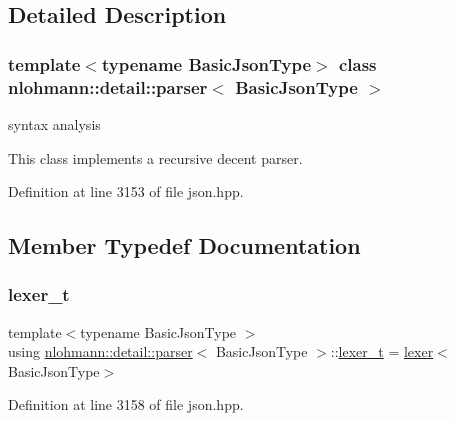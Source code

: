 \subsection{Detailed Description}
\subsubsection*{template$<$typename Basic\+Json\+Type$>$\newline
class nlohmann\+::detail\+::parser$<$ Basic\+Json\+Type $>$}

syntax analysis 

This class implements a recursive decent parser. 

Definition at line 3153 of file json.\+hpp.



\subsection{Member Typedef Documentation}
\mbox{\label{classnlohmann_1_1detail_1_1parser_a16030c5af158a94d1c799f82ff3a0147}} 
\subsubsection{\texorpdfstring{lexer\+\_\+t}{lexer\_t}}
{\footnotesize\ttfamily template$<$typename Basic\+Json\+Type $>$ \\
using \hyperlink{classnlohmann_1_1detail_1_1parser}{nlohmann\+::detail\+::parser}$<$ Basic\+Json\+Type $>$\+::\hyperlink{classnlohmann_1_1detail_1_1parser_a16030c5af158a94d1c799f82ff3a0147}{lexer\+\_\+t} =  \hyperlink{classnlohmann_1_1detail_1_1lexer}{lexer}$<$Basic\+Json\+Type$>$\hspace{0.3cm}{\ttfamily [private]}}



Definition at line 3158 of file json.\+hpp.

\mbox{\label{classnlohmann_1_1detail_1_1parser_a8ca8e734da0632c2731fc3b9547dcf28}} 
